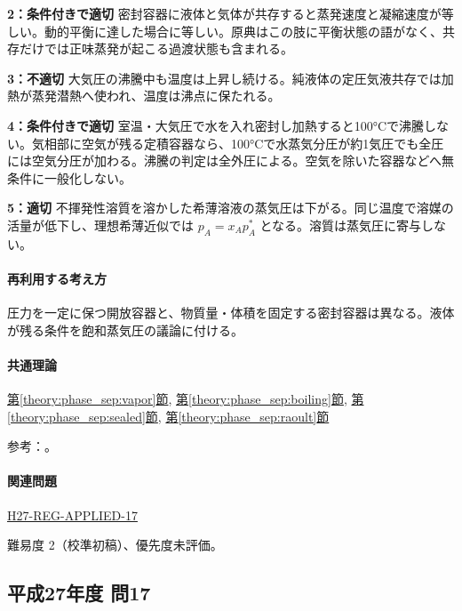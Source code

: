 \noindent\textbf{2：条件付きで適切} 密封容器に液体と気体が共存すると蒸発速度と凝縮速度が等しい。動的平衡に達した場合に等しい。原典はこの肢に平衡状態の語がなく、共存だけでは正味蒸発が起こる過渡状態も含まれる。\par

\noindent\textbf{3：不適切} 大気圧の沸騰中も温度は上昇し続ける。純液体の定圧気液共存では加熱が蒸発潜熱へ使われ、温度は沸点に保たれる。\par

\noindent\textbf{4：条件付きで適切} 室温・大気圧で水を入れ密封し加熱すると100°Cで沸騰しない。気相部に空気が残る定積容器なら、100°Cで水蒸気分圧が約1気圧でも全圧には空気分圧が加わる。沸騰の判定は全外圧による。空気を除いた容器などへ無条件に一般化しない。\par

\noindent\textbf{5：適切} 不揮発性溶質を溶かした希薄溶液の蒸気圧は下がる。同じ温度で溶媒の活量が低下し、理想希薄近似では \(p_A=x_Ap_A^*\) となる。溶質は蒸気圧に寄与しない。\par

\paragraph{再利用する考え方} 圧力を一定に保つ開放容器と、物質量・体積を固定する密封容器は異なる。液体が残る条件を飽和蒸気圧の議論に付ける。

\paragraph{共通理論} \hyperref[theory:phase_sep:vapor]{第\ref*{theory:phase_sep:vapor}節}, \hyperref[theory:phase_sep:boiling]{第\ref*{theory:phase_sep:boiling}節}, \hyperref[theory:phase_sep:sealed]{第\ref*{theory:phase_sep:sealed}節}, \hyperref[theory:phase_sep:raoult]{第\ref*{theory:phase_sep:raoult}節}

\par 参考：\cite{mit_solutions2008,mit_clapeyron2008}。

\paragraph{関連問題} \hyperref[q:h27-reg-applied-17]{H27-REG-APPLIED-17}

\par 難易度 2（校準初稿）、優先度未評価。

\subsection{平成27年度 問17}
\label{q:h27-reg-applied-17}


